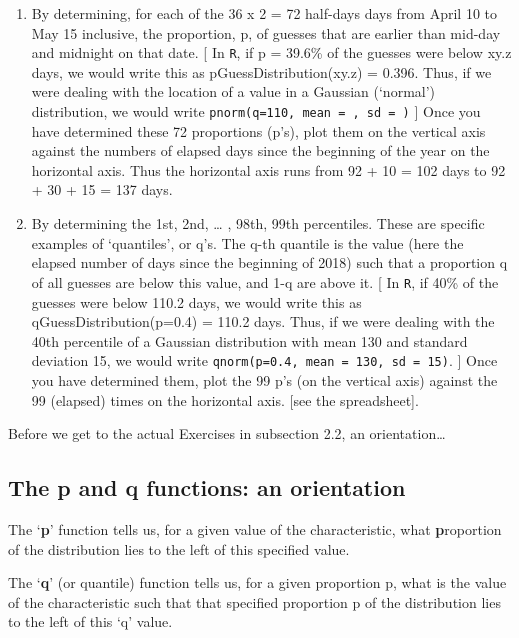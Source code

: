 \documentclass[]{book}
\begin{document}
\begin{enumerate}
\def\labelenumi{\arabic{enumi}.}
\item
  By determining, for each of the 36 x 2 = 72 half-days days from April 10 to May 15 inclusive, the proportion, p, of guesses that are earlier than mid-day and midnight on that date. {[} In \texttt{R}, if p = 39.6\% of the guesses were below xy.z days, we would write this as pGuessDistribution(xy.z) = 0.396. Thus, if we were dealing with the location of a value in a Gaussian (`normal') distribution, we would write \texttt{pnorm(q=110,\ mean\ =\ ,\ sd\ =\ )} {]} Once you have determined these 72 proportions (p's), plot them on the vertical axis against the numbers of elapsed days since the beginning of the year on the horizontal axis. Thus the horizontal axis runs from 92 + 10 = 102 days to 92 + 30 + 15 = 137 days.
\item
  By determining the 1st, 2nd, \ldots{} , 98th, 99th percentiles. These are specific examples of `quantiles', or q's. The q-th quantile is the value (here the elapsed number of days since the beginning of 2018) such that a proportion q of all guesses are below this value, and 1-q are above it. {[} In \texttt{R}, if 40\% of the guesses were below 110.2 days, we would write this as qGuessDistribution(p=0.4) = 110.2 days. Thus, if we were dealing with the 40th percentile of a Gaussian distribution with mean 130 and standard deviation 15, we would write \texttt{qnorm(p=0.4,\ mean\ =\ 130,\ sd\ =\ 15)}. {]} Once you have determined them, plot the 99 p's (on the vertical axis) against the 99 (elapsed) times on the horizontal axis. {[}see the spreadsheet{]}.
\end{enumerate}

Before we get to the actual Exercises in subsection 2.2, an orientation\ldots{}

\hypertarget{the-p-and-q-functions-an-orientation}{%
\subsection{The p and q functions: an orientation}\label{the-p-and-q-functions-an-orientation}}

The `\textbf{p}' function tells us, for a given value of the characteristic, what \textbf{p}roportion of the distribution lies to the left of this specified value.

The `\textbf{q}' (or quantile) function tells us, for a given proportion p, what is the value of the characteristic such that that specified proportion p of the distribution lies to the left of this `q' value.
\end{document}
